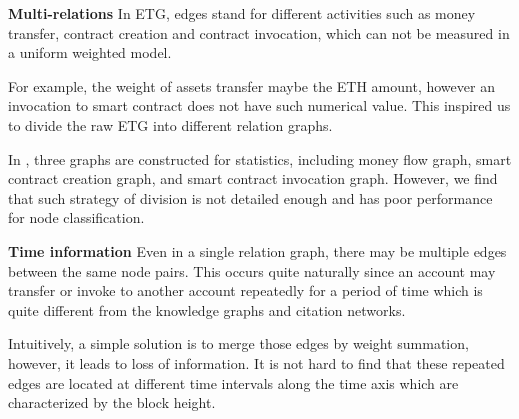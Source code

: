 \textbf{Multi-relations} In ETG, edges stand for different activities such as money transfer, contract creation and contract invocation, which can not be measured in a uniform weighted model. 

For example, the weight of assets transfer maybe the ETH amount, however an invocation to smart contract does not have such numerical value. This inspired us to divide the raw ETG into different relation graphs. 

In \cite{chen2018infocom}, three graphs are constructed for statistics, including money flow graph, smart contract creation graph, and smart contract invocation graph. However, we find that such strategy of division is not detailed enough and has poor performance for node classification.





\textbf{Time information} Even in a single relation graph, there may be multiple edges between the same node pairs. This occurs quite naturally since an account may transfer or invoke to another account repeatedly for a period of time which is quite different from the knowledge graphs and citation networks.

Intuitively, a simple solution is to merge those edges by weight summation, however, it leads to loss of information. It is not hard to find that these repeated edges are located at different time intervals along the time axis which are characterized by the block height. 

